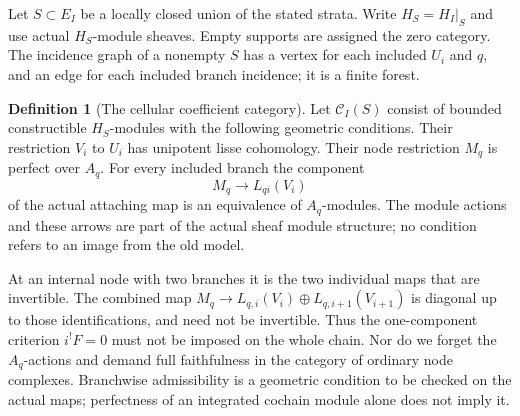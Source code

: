 \documentclass[11pt]{article}
\theoremstyle{definition}
\newtheorem{definition}[theorem]{Definition}
\theoremstyle{remark}
\begin{document}
Let $S\subset E_I$ be a locally closed union of the stated strata.
Write $H_S=H_I|_S$ and use actual $H_S$-module sheaves.  Empty supports
are assigned the zero category.  The incidence graph of a nonempty $S$
has a vertex for each included $U_i$ and $q$, and an edge for each
included branch incidence; it is a finite forest.

\begin{definition}[The cellular coefficient category]\label{def:cell-category}
Let $\mathcal C_I(S)$ consist of bounded constructible $H_S$-modules
with the following geometric conditions.  Their restriction $V_i$ to
$U_i$ has unipotent lisse cohomology.  Their node restriction $M_q$
is perfect over $A_q$.  For every included branch the component
\[
 M_q\longrightarrow L_{qi}(V_i)
\]
of the actual attaching map is an equivalence of $A_q$-modules.
The module actions and these arrows are part of the actual sheaf
module structure; no condition refers to an image from the old model.
\end{definition}

At an internal node with two branches it is the two individual maps
that are invertible.  The combined map
$M_q\to L_{q,i}(V_i)\oplus L_{q,i+1}(V_{i+1})$
is diagonal up to those identifications, and need not be invertible.
Thus the one-component criterion $i^!F=0$ must not be imposed on the
whole chain.  Nor do we forget the $A_q$-actions and demand full
faithfulness in the category of ordinary node complexes.  Branchwise
admissibility is a geometric condition to be checked on the actual maps;
perfectness of an integrated cochain module alone does not imply it.
\end{document}
